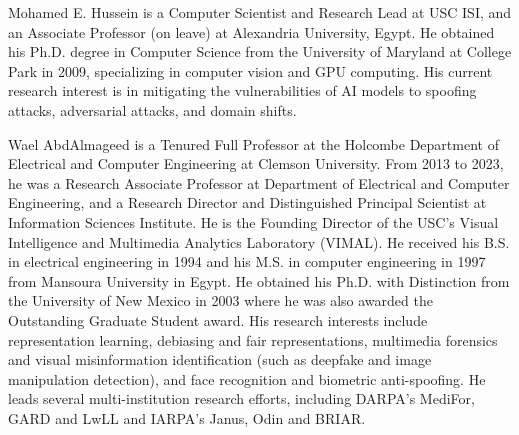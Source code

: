 \vspace{-15mm}

\begin{IEEEbiography}{Mohamed E. Hussein}
is a Computer Scientist and Research Lead at USC ISI, and an Associate Professor (on leave) at Alexandria University, Egypt. He obtained his Ph.D. degree in Computer Science from the University of Maryland at College Park in 2009, specializing in computer vision and GPU computing.
His current research interest is in mitigating the vulnerabilities of AI models to spoofing attacks, adversarial attacks, and domain shifts.
\end{IEEEbiography}

\vspace{-15mm}

\begin{IEEEbiography}{Wael AbdAlmageed}
is a Tenured Full Professor at the Holcombe Department of Electrical and Computer Engineering at Clemson University. From 2013 to 2023, he was a Research Associate Professor at Department of Electrical and Computer Engineering, and a Research Director and Distinguished Principal Scientist at Information Sciences Institute. He is the Founding Director of the USC’s Visual Intelligence and Multimedia Analytics Laboratory (VIMAL). He received his B.S. in electrical engineering in 1994 and his M.S. in computer engineering in 1997 from Mansoura University in Egypt. 
He obtained his Ph.D. with Distinction from the University of New Mexico in 2003 where he was also awarded the Outstanding Graduate Student award. His research interests include representation learning, debiasing and fair representations, multimedia forensics and visual misinformation identification (such as deepfake and image manipulation detection), and face recognition and biometric anti-spoofing. He leads several multi-institution research efforts, including DARPA’s MediFor, GARD and LwLL and IARPA’s Janus, Odin and BRIAR. 

\end{IEEEbiography}
